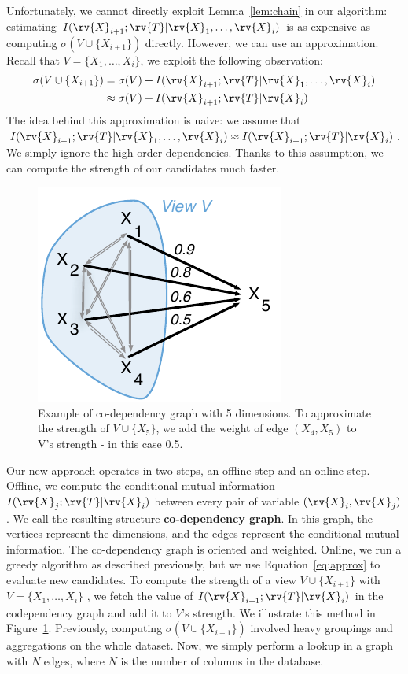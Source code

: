 Unfortunately, we cannot directly exploit Lemma~\ref{lem:chain} in our
algorithm: estimating $I(\rv{X}_{i+1} ; \rv{T} | \rv{X}_1 , \ldots, \rv{X}_i)$
is as expensive as computing $\sigma(V \cup \{X_{i+1}\}) $ directly.  However,
we can use an approximation.  Recall that $V = \{X_1, \ldots, X_i\}$, we
exploit the following observation:
\begin{equation}\label{eq:approx}
\begin{split}
    \sigma(V \cup \{X_{i+1}\}) & = \sigma(V)   + I(\rv{X}_{i+1} ; \rv{T} |
    \rv{X}_1, \ldots, \rv{X}_{i})\\
    & \approx \sigma(V) + I(\rv{X}_{i+1} ; \rv{T} | \rv{X}_{i})
\end{split}
\end{equation}
The idea behind this approximation is naive: we assume that $I(\rv{X}_{i+1} ;
\rv{T} | \rv{X}_1, \ldots, \rv{X}_{i}) \approx I(\rv{X}_{i+1} ; \rv{T} |
\rv{X}_{i})$. We simply ignore the high order dependencies. Thanks to this
assumption, we can compute the strength of our candidates much faster. 

\begin{figure}[t!]
\centering
\includegraphics[width=0.4\columnwidth]{images/codependency}
\caption{Example of co-dependency graph with 5 dimensions. To approximate the
strength of $V \cup \{X_5\}$, we add the weight of edge $(X_4, X_5)$ to V's
strength -  in this case 0.5.}
\label{pic:codependency}
\end{figure}
Our new approach operates in two steps, an offline step and an online step.
Offline, we compute the conditional mutual information  $ I(\rv{X}_j ; \rv{T} |
\rv{X}_i)$ between every pair of variable $(\rv{X}_i, \rv{X}_j)$. We call the
resulting structure \textbf{co-dependency graph}. In this graph, the vertices
represent the dimensions, and the edges represent the conditional mutual
information. The co-dependency graph is oriented and weighted.  Online, we run
a greedy algorithm as described previously, but we use Equation~\ref{eq:approx}
to evaluate new candidates.  To compute the strength of a view $V \cup
\{X_{i+1}\}$ with  $V= \{X_1, \ldots, X_i\}$ , we fetch the value of  $
I(\rv{X}_{i+1} ; \rv{T} | \rv{X}_i)$ in the codependency graph and add it to
$V$'s strength. We illustrate this method in Figure~\ref{pic:codependency}.
Previously, computing $\sigma(V \cup \{X_{i+1}\})$ involved heavy groupings and
aggregations on the whole dataset.  Now, we simply perform a lookup in a graph
with $N$ edges, where $N$ is the number of columns in the database.

